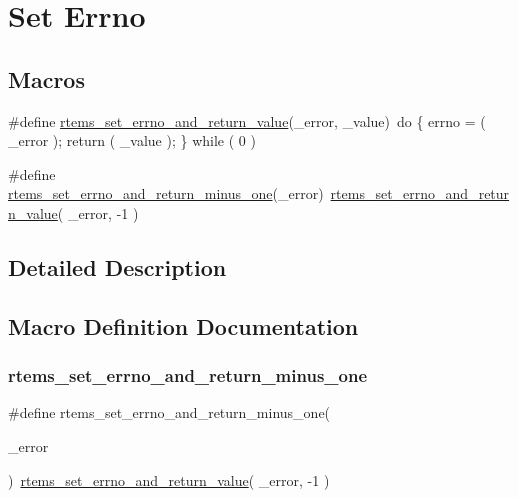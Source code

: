 \hypertarget{group__RTEMSScoreSetErr}{}\section{Set Errno}
\label{group__RTEMSScoreSetErr}
\subsection*{Macros}
\begin{DoxyCompactItemize}
\item 
\#define \mbox{\hyperlink{group__RTEMSScoreSetErr_ga73857b80a2faf4afa7fef24120368cfb}{rtems\+\_\+set\+\_\+errno\+\_\+and\+\_\+return\+\_\+value}}(\+\_\+error,  \+\_\+value)~do \{ errno = ( \+\_\+error ); return ( \+\_\+value ); \} while ( 0 )
\item 
\#define \mbox{\hyperlink{group__RTEMSScoreSetErr_gadb4c7371c6413efe9a61633f842d5e30}{rtems\+\_\+set\+\_\+errno\+\_\+and\+\_\+return\+\_\+minus\+\_\+one}}(\+\_\+error)~\mbox{\hyperlink{group__RTEMSScoreSetErr_ga73857b80a2faf4afa7fef24120368cfb}{rtems\+\_\+set\+\_\+errno\+\_\+and\+\_\+return\+\_\+value}}( \+\_\+error, -\/1 )
\end{DoxyCompactItemize}


\subsection{Detailed Description}


\subsection{Macro Definition Documentation}
\mbox{\label{group__RTEMSScoreSetErr_gadb4c7371c6413efe9a61633f842d5e30}} 
\subsubsection{\texorpdfstring{rtems\_set\_errno\_and\_return\_minus\_one}{rtems\_set\_errno\_and\_return\_minus\_one}}
{\footnotesize\ttfamily \#define rtems\+\_\+set\+\_\+errno\+\_\+and\+\_\+return\+\_\+minus\+\_\+one(\begin{DoxyParamCaption}\item[{}]{\+\_\+error }\end{DoxyParamCaption})~\mbox{\hyperlink{group__RTEMSScoreSetErr_ga73857b80a2faf4afa7fef24120368cfb}{rtems\+\_\+set\+\_\+errno\+\_\+and\+\_\+return\+\_\+value}}( \+\_\+error, -\/1 )}

